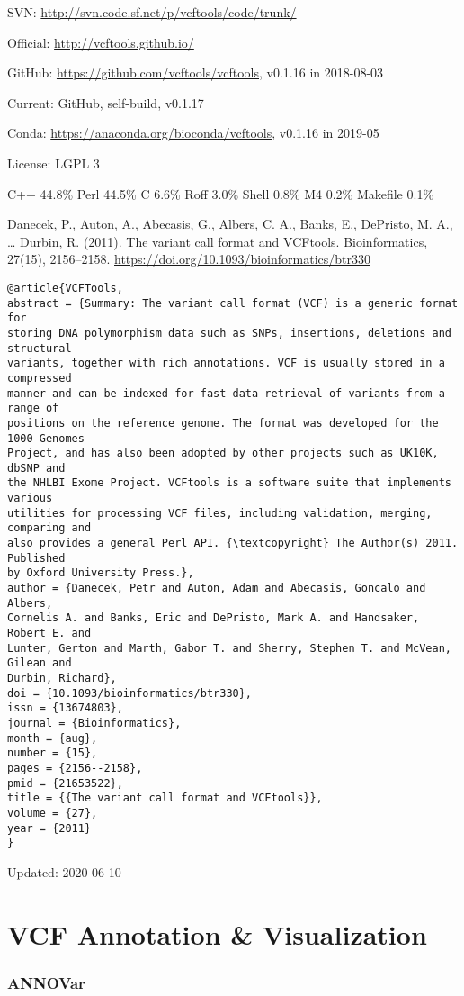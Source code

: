 \documentclass[]{article}
\begin{document}
SVN: \url{http://svn.code.sf.net/p/vcftools/code/trunk/}

Official: \url{http://vcftools.github.io/}

GitHub: \url{https://github.com/vcftools/vcftools}, v0.1.16 in 2018-08-03

Current: GitHub, self-build, v0.1.17

Conda: \url{https://anaconda.org/bioconda/vcftools}, v0.1.16 in 2019-05

License: LGPL 3

C++ 44.8\% Perl 44.5\% C 6.6\% Roff 3.0\% Shell 0.8\% M4 0.2\% Makefile 0.1\%

Danecek, P., Auton, A., Abecasis, G., Albers, C. A., Banks, E., DePristo, M. A., … Durbin, R. (2011). The variant call format and VCFtools. Bioinformatics, 27(15), 2156–2158. \url{https://doi.org/10.1093/bioinformatics/btr330}

\begin{verbatim}
@article{VCFTools,
abstract = {Summary: The variant call format (VCF) is a generic format for
storing DNA polymorphism data such as SNPs, insertions, deletions and structural
variants, together with rich annotations. VCF is usually stored in a compressed
manner and can be indexed for fast data retrieval of variants from a range of
positions on the reference genome. The format was developed for the 1000 Genomes
Project, and has also been adopted by other projects such as UK10K, dbSNP and
the NHLBI Exome Project. VCFtools is a software suite that implements various
utilities for processing VCF files, including validation, merging, comparing and
also provides a general Perl API. {\textcopyright} The Author(s) 2011. Published
by Oxford University Press.},
author = {Danecek, Petr and Auton, Adam and Abecasis, Goncalo and Albers,
Cornelis A. and Banks, Eric and DePristo, Mark A. and Handsaker, Robert E. and
Lunter, Gerton and Marth, Gabor T. and Sherry, Stephen T. and McVean, Gilean and
Durbin, Richard},
doi = {10.1093/bioinformatics/btr330},
issn = {13674803},
journal = {Bioinformatics},
month = {aug},
number = {15},
pages = {2156--2158},
pmid = {21653522},
title = {{The variant call format and VCFtools}},
volume = {27},
year = {2011}
}
\end{verbatim}

Updated: 2020-06-10

\part{VCF Annotation \& Visualization}
\section{ANNOVar}
\end{document}
